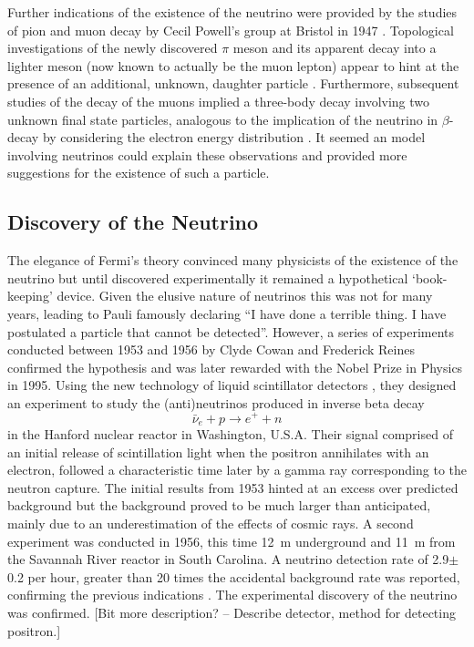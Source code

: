 Further indications of the existence of the neutrino were provided by the studies of pion and muon decay by Cecil Powell's group at Bristol in 1947 \cite{Lattes1947-159,Lattes1947-160}.  Topological investigations of the newly discovered $\pi$ meson and its apparent decay into a lighter meson (now known to actually be the muon lepton) appear to hint at the presence of an additional, unknown, daughter particle \cite{Lattes1947-159}.  Furthermore, subsequent studies of the decay of the muons implied a three-body decay involving two unknown final state particles, analogous to the implication of the neutrino in $\beta$-decay by considering the electron energy distribution \cite{Brown1949}.  It seemed an model involving neutrinos could explain these observations and provided more suggestions for the existence of such a particle.

\subsection{Discovery of the Neutrino}\label{NeutrinoDiscovery}

The elegance of Fermi's theory convinced many physicists of the existence of the neutrino but until discovered experimentally it remained a hypothetical `book-keeping' device.  Given the elusive nature of neutrinos this was not for many years, leading to Pauli famously declaring ``I have done a terrible thing. I have postulated a particle that cannot be detected''.  However, a series of experiments conducted between 1953 and 1956 by Clyde Cowan and Frederick Reines confirmed the hypothesis and was later rewarded with the Nobel Prize in Physics in 1995.  Using the new technology of liquid scintillator detectors \cite{ReinesCowanLiquidScintillation}, they designed an experiment \cite{ReinesCowan1953Proposal} to study the (anti)neutrinos produced in inverse beta decay
\begin{equation}\label{eq:InverseBetaDecay}
  {\bar{\nu}}_e + p \rightarrow e^+ + n
\end{equation}
in the Hanford nuclear reactor in Washington, U.S.A.  Their signal comprised of an initial release of scintillation light when the positron annihilates with an electron, followed a characteristic time later by a gamma ray corresponding to the neutron capture.  The initial results from 1953 \cite{ReinesCowan1953} hinted at an excess over predicted background but the background proved to be much larger than anticipated, mainly due to an underestimation of the effects of cosmic rays.  A second experiment was conducted in 1956, this time 12~m underground and 11~m from the Savannah River reactor in South Carolina.  A neutrino detection rate of 2.9$\pm$0.2 per hour, greater than 20 times the accidental background rate was reported, confirming the previous indications \cite{ReinesCowan1956}.  The experimental discovery of the neutrino was confirmed.  [Bit more description? -- Describe detector, method for detecting positron.]

